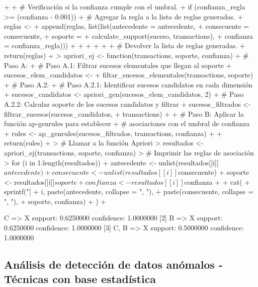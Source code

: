 \documentclass[a4paper, 12pt]{article}
\begin{document}
\begin{Schunk}
\begin{Sinput}
{{{{+         
+         # Verificación si la confianza cumple con el umbral.
+         if (confianza_regla >= (confianza - 0.001)) {
+           # Agregar la regla a la lista de reglas generadas.
+           reglas <- 
+ 		  append(reglas, list(list(antecedente = antecedente,
+                                     consecuente = consecuente,
+                                     soporte = 
+ 				calculate_support(suceso, transactions),
+                                     confianza = confianza_regla)))
+         }
+       }
+     }
+   }
+   
+   # Devolver la lista de reglas generadas.
+   return(reglas)
+ }
> apriori_ej <- function(transactions, soporte, confianza) {
+ 	# Paso A:
+ 	# Paso A.1: Filtrar sucesos elementales que llegan al soporte
+ 	sucesos_elem_candidatos <- 
+ 	filtar_sucesos_elementales(transactions, soporte)
+ 	# Paso A.2:
+ 	# Paso A.2.1: Identificar sucesos candidatos en cada dimensión
+ 	sucesos_candidatos <- apriori_gen(sucesos_elem_candidatos, 2)
+ 	# Paso A.2.2: Calcular soporte de los sucesos candidatos y filtrar
+ 	sucesos_filtrados <- filtrar_sucesos(sucesos_candidatos,
+ 	transactions)
+ 
+ 	# Paso B: Aplicar la función ap-genrules para establecer 
+ 	# 		  asociaciones con el umbral de confianza
+ 	rules <- ap_genrules(sucesos_filtrados, transactions, confianza)
+ 
+ 	return(rules)
+ }
> # Llamar a la función Apriori
> resultados <- apriori_ej(transactions, soporte, confianza)
> # Imprimir las reglas de asociación
> for (i in 1:length(resultados)) {
+ 	antecedente <- unlist(resultados[[i]]$antecedente)
+ 	consecuente <- unlist(resultados[[i]]$consecuente)
+ 	soporte <- resultados[[i]]$soporte
+ 	confianza <- resultados[[i]]$confianza
+ 	
+ 	cat(
+ 	sprintf("[%
+ 			i, paste(antecedente, collapse = ", "), 
+ 			paste(consecuente, collapse = ", "),
+ 			soporte, confianza)
+ 	)
+ }
\end{Sinput}
\begin{Soutput}
[1] {C} => {X}  support: 0.6250000  confidence: 1.0000000
[2] {B} => {X}  support: 0.6250000  confidence: 1.0000000
[3] {C, B} => {X}  support: 0.5000000  confidence: 1.0000000
\end{Soutput}
\end{Schunk}

	\subsection{Análisis de detección de datos anómalos - Técnicas con base estadística}
\end{document}
